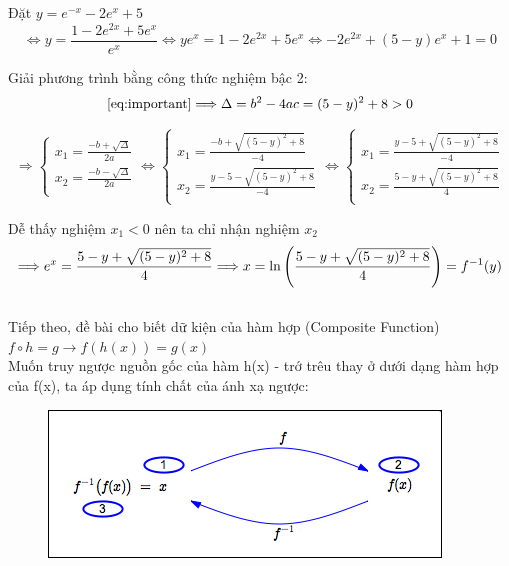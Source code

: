 \documentclass[a4paper]{exam}
\begin{document}
	Đặt $y = e^{-x} - 2e^{x} + 5$ 
	\begin{equation}
		\label{eq:important}
		\Longleftrightarrow y = \frac{1 - 2e^{2x} + 5e^{x}}{e^{x}} \Longleftrightarrow ye^{x} = 1 - 2e^{2x} + 5e^{x} \Longleftrightarrow -2e^{2x} + (5 - y)e^{x} + 1 = 0
	\end{equation}
	
	Giải phương trình bằng công thức nghiệm bậc 2:
	\begin{align*}
		\eqref{eq:important} \Longrightarrow \Delta = b^{2} - 4ac = (5 - y)^{2} + 8 > 0
	\end{align*}
	
	$$
	\Longrightarrow \begin{cases}
		x_1 = \frac{-b + \sqrt{\Delta}}{2a}\\
		x_2 = \frac{-b - \sqrt{\Delta}}{2a}\\
	\end{cases} 
	\Longleftrightarrow \begin{cases}
			x_1 = \frac{-b + \sqrt{(5 - y)^{2} + 8}}{-4}\\
			x_2 = \frac{y - 5 - \sqrt{(5 - y)^{2} + 8}}{-4}\\
	\end{cases}
	\Longleftrightarrow \begin{cases}
			x_1 = \frac{y - 5 + \sqrt{(5 - y)^{2} + 8}}{-4}\\
			x_2 = \frac{5 - y + \sqrt{(5 - y)^{2} + 8}}{4}\\
	\end{cases}
	$$	
	
	Dễ thấy nghiệm $x_{1} < 0$ nên ta chỉ nhận nghiệm $x_{2}$\\
	
	$$ \Longrightarrow e^{x} = \frac{5 - y + \sqrt{(5 - y)^{2} + 8}}{4} \\
	\Longrightarrow x = \ln \left( \frac{5 - y + \sqrt{(5 - y)^{2} + 8}}{4} \right)= f^{-1}(y)$$\\
	
	Tiếp theo, đề bài cho biết dữ kiện của hàm hợp (Composite Function) $f \circ h = g \longrightarrow f(h(x)) = g(x)$\\
	
	Muốn truy ngược nguồn gốc của hàm h(x) - trớ trêu thay ở dưới dạng hàm hợp của f(x), ta áp dụng tính chất của ánh xạ ngược:
	
	\begin{figure}[H]
		\centering
		\includegraphics[totalheight=2.75cm]{finvCircf.png}  %
		\label{fig:inverse_prop}
	\end{figure}
	
\end{document}
